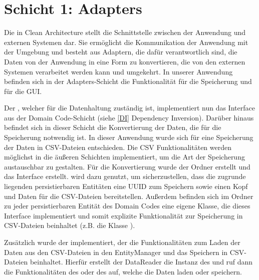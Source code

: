 \section{Schicht 1: Adapters}
Die \href{https://github.com/MichaelaHaag/RezeptApp/tree/main/1-Adapter}{} in Clean Architecture stellt die Schnittstelle zwischen der Anwendung und externen Systemen dar. Sie ermöglicht die Kommunikation der Anwendung mit der Umgebung und besteht aus Adaptern, die dafür verantwortlich sind, die Daten von der Anwendung in eine Form zu konvertieren, die von den externen Systemen verarbeitet werden kann und umgekehrt. In unserer Anwendung befinden sich in der Adapters-Schicht die Funktionalität für die Speicherung und für die GUI. 

Der \href{https://github.com/MichaelaHaag/RezeptApp/tree/main/1-Adapter/src/main/java/de/rezeptapp/adapter/Datenpersistenz/EntityManager.java}{}, welcher für die Datenhaltung zuständig ist, implementiert nun das Interface  aus der Domain Code-Schicht (siehe \autoref{DI} Dependency Inversion). Darüber hinaus befindet sich in dieser Schicht die Konvertierung der Daten, die für die Speicherung notwendig ist. In dieser Anwendung wurde sich für eine Speicherung der Daten in CSV-Dateien entschieden. Die CSV Funktionalitäten werden möglichst in die äußeren Schichten implementiert, um die Art der Speicherung austauschbar zu gestalten. 
Für die Konvertierung wurde der Ordner \href{https://github.com/MichaelaHaag/RezeptApp/tree/main/1-Adapter/src/main/java/de/rezeptapp/adapter/Datenpersistenz}{} erstellt und das Interface \href{https://github.com/MichaelaHaag/RezeptApp/blob/main/1-Adapter/src/main/java/de/rezeptapp/adapter/Datenpersistenz/ICSVPersistierbar.java}{} erstellt.  wird dazu genutzt, um sicherzustellen, dass die zugrunde liegenden persistierbaren Entitäten eine UUID zum Speichern sowie einen Kopf und Daten für die CSV-Dateien bereitstellen. Außerdem befinden sich im Ordner zu jeder persistierbaren Entität des Domain Codes eine eigene Klasse, die dieses Interface implementiert und somit explizite Funktionalität zur Speicherung in CSV-Dateien beinhaltet (z.B. die Klasse \href{https://github.com/MichaelaHaag/RezeptApp/blob/main/1-Adapter/src/main/java/de/rezeptapp/adapter/Datenpersistenz/CSVZutat.java}{}). 

Zusätzlich wurde der \href{https://github.com/MichaelaHaag/RezeptApp/tree/main/1-Adapter/src/main/java/de/rezeptapp/adapter/Datenpersistenz/DataReader.java}{} implementiert, der die Funktionalitäten zum Laden der Daten aus den CSV-Dateien in den EntityManager und das Speichern in CSV-Dateien beinhaltet. Hierfür erstellt der DataReader die Instanz des  und ruf dann die Funktionalitäten des  oder des  auf, welche die Daten laden oder speichern. 

